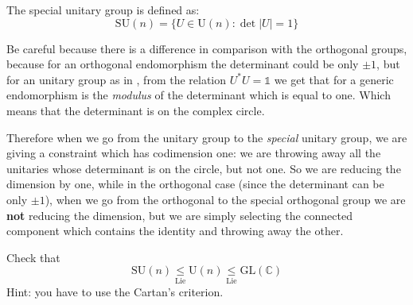 \documentclass[../main.tex]{subfiles}
\begin{document}
\begin{definition}
The special unitary group is defined as:
\[
\textrm{SU}(n)=\{U\in \textrm{U}(n):{\det|U|=1}\}
\]
\end{definition}
Be careful because there is a difference in comparison with the orthogonal groups, because for an orthogonal endomorphism the determinant could be only $\pm 1$, but for an unitary group as in , from the relation $U^*U=\mathbb{1}$ we get that for a generic endomorphism is the \textit{modulus} of the determinant which is equal to one. Which means that the determinant is on the complex circle.

Therefore when we go from the unitary group to the \textit{special} unitary group, we are giving a constraint which has codimension one: we are throwing away all the unitaries whose determinant is on the circle, but not one. So we are reducing the dimension by one, while in the orthogonal case (since the determinant can be only $\pm 1$), when we go from the orthogonal to the special orthogonal group we are \textbf{not} reducing the dimension, but we are simply selecting the connected component which contains the identity and throwing away the other.
\begin{exercise}
Check that
\[
\textrm{SU}(n)\underset{\textrm{Lie}}{\leq}\textrm{U}(n)\underset{\textrm{Lie}}{\leq} \textrm{GL}(\mathbb{C})
\]
Hint: you have to use the Cartan's criterion.
\end{exercise}
\end{document}
